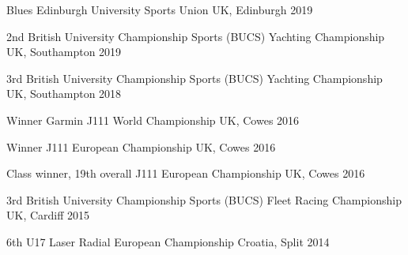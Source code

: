 




\begin{cvhonors}
  \cvhonor
    {Blues} %
    {Edinburgh University Sports Union} %
    {UK, Edinburgh} %
    {2019} %

  \cvhonor
    {2nd} %
    {British University Championship Sports (BUCS) Yachting Championship} %
    {UK, Southampton} %
    {2019} %
    

  \cvhonor
    {3rd} %
    {British University Championship Sports (BUCS) Yachting Championship} %
    {UK, Southampton} %
    {2018} %


  \cvhonor
    {Winner} %
    {Garmin J111 World Championship} %
    {UK, Cowes} %
    {2016} %

  \cvhonor
    {Winner} %
    {J111 European Championship} %
    {UK, Cowes} %
    {2016} %

  \cvhonor
    {Class winner, 19th overall} %
    {J111 European Championship} %
    {UK, Cowes} %
    {2016} %
    


  \cvhonor
    {3rd} %
    {British University Championship Sports (BUCS) Fleet Racing Championship} %
    {UK, Cardiff} %
    {2015} %


  \cvhonor
    {6th U17} %
    {Laser Radial European Championship} %
    {Croatia, Split} %
    {2014} %



\end{cvhonors}


